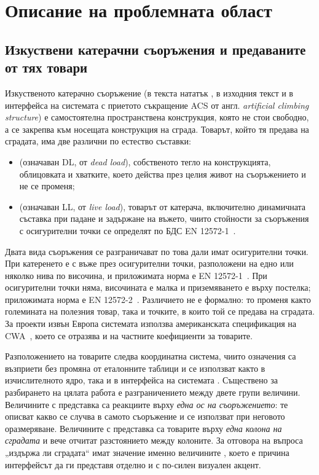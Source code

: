 \section{Описание на проблемната област}
\label{sec:domain}

\subsection{Изкуствени катерачни съоръжения и предаваните от тях товари}
\label{subsec:acs}

Изкуственото катерачно съоръжение (в текста нататък , в изходния
текст и в интерфейса на системата с приетото съкращение ACS от англ.
\emph{artificial climbing structure}) е самостоятелна пространствена конструкция,
която не стои свободно, а се закрепва към носещата конструкция на сграда. Товарът,
който тя предава на сградата, има две различни по естество съставки:

\begin{itemize}[topsep=2pt,itemsep=1pt,leftmargin=*]
\item {} (означаван DL, от \emph{dead load}), собственото тегло на
      конструкцията, облицовката и хватките, което действа през целия живот на
      съоръжението и не се променя;
\item {} (означаван LL, от \emph{live load}), товарът от катерача,
      включително динамичната съставка при падане и задържане на въжето, чиито
      стойности за съоръжения с осигурителни точки се определят по БДС EN
      12572-1~\cite{en12572_1}.
\end{itemize}

Двата вида съоръжения се разграничават по това дали имат осигурителни точки. При
 катеренето е с въже през осигурителни точки, разположени на
едно или няколко нива по височина, и приложимата норма е EN
12572-1~\cite{en12572_1}. При  осигурителни точки няма,
височината е малка и приземяването е върху постелка; приложимата норма е EN
12572-2~\cite{en12572_2}. Различието не е формално: то променя както големината на
полезния товар, така и точките, в които той се предава на сградата. За проекти извън
Европа системата използва американската спецификация на CWA~\cite{cwa2009}, което се
отразява и на частните коефициенти за товарите.

Разположението на товарите следва координатна система, чиито означения са възприети
без промяна от еталонните таблици и се използват както в изчислителното ядро, така и
в интерфейса на системата . Съществено за разбирането на цялата
работа е разграничението между двете групи величини. Величините с представка
 са реакциите върху \emph{една ос на съоръжението}: те описват какво се случва
в самото съоръжение и се използват при неговото оразмеряване. Величините с представка
 са товарите върху \emph{една колона на сградата} и вече отчитат разстоянието
между колоните. За отговора на въпроса „издържа ли сградата“ имат значение именно
величините , което е причина интерфейсът да ги представя отделно и с по-силен
визуален акцент.

